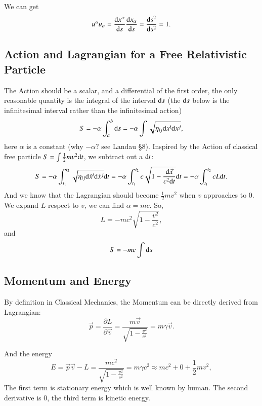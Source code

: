 \documentclass[openany,10pt]{book}
\theoremstyle{definition}
\theoremstyle{definition}
\theoremstyle{remark}
\begin{document}
We can get 
\begin{equation}
u^\alpha u_\alpha=\frac{{\rm d}x^\alpha}{{\rm d}s}\frac{{\rm d}x_\alpha}{{\rm d}s}=\frac{{\rm d}s^2}{{\rm d}s^2}=1.
\end{equation}

\subsection{Action and Lagrangian for a Free Relativistic Particle}\label{freeaction}
The Action should be a scalar, and a differential of the first order, the only reasonable quantity is the integral of the interval ${\rm d}s$ (the ${\rm d}s$ below is the infinitesimal interval rather than the infinitesimal action)
\begin{equation}
    S=-\alpha \int^b_a {\rm d}s=-\alpha \int \sqrt{\eta_{ij}{\rm d}x^i{\rm d}x^j},
\end{equation}
here $\alpha$ is a constant (why $-\alpha$? see Landau \S 8). Inspired by the Action of classical free particle $S=\int \frac12 mv^2{\rm d}t$, we subtract out a ${\rm d}t$:
\begin{equation}
    S=-\alpha \int^{t_2}_{t_1} \sqrt{\eta_{ij}{\rm d}\dot x^i{\rm d}\dot x^j}{\rm d}t=-\alpha \int^{t_2}_{t_1} c \sqrt{1-\frac{{\rm d}\vec x}{c^2{\rm d}t}}{\rm d}t=-\alpha \int^{t_2}_{t_1}c L{\rm d}t.
\end{equation}
And we know that the Lagrangian should become $\frac12 mv^2$ when $v$ approaches to 0. We expand $L$ respect to $v$, we can find $\alpha=mc$.
So,
\begin{equation}
    \boxed{
    L=-mc^2\sqrt{1-\frac{v^2}{c^2}},
    }
\end{equation}
and
\begin{equation}
   S=-mc\int {\rm d}s
\end{equation}


\subsection{Momentum and Energy}
By definition in Classical Mechanics, the Momentum can be directly derived from Lagrangian:
\begin{equation}
    \vec p=\frac{\partial L}{\partial \vec v}=\frac{m\vec v}{\sqrt{1-\frac{v^2}{c^2}}}=m \gamma \vec v.
\end{equation}

And the energy
\begin{equation}
    E=\vec p \vec v-L=\frac{mc^2}{\sqrt{1-\frac{v^2}{c^2}}}=m\gamma c^2\approx mc^2+0+\frac12 m v^2,
\end{equation}
The first term is stationary energy which is well known by human. The second derivative is 0, the third term is kinetic energy.
\end{document}
